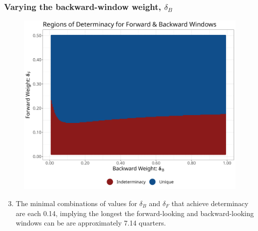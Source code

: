 \documentclass{beamer}
\begin{document}
\begin{frame}
	\frametitle{Varying the backward-window weight, $\delta_B$}	
	\begin{center}		
		\begin{figure}%
			\includegraphics[width=\textwidth,height=0.5\textheight,keepaspectratio]{../code/deltab_deltaF.png}
		\end{figure}%
	\end{center}%
	\begin{enumerate}
		\setcounter{enumi}{2}
		\setlength{\itemsep}{1em}
		\item The minimal combinations of values for $\delta_B$ and $\delta_F$ that achieve determinacy are each 0.14, implying the longest the forward-looking and backward-looking windows can be are approximately 7.14 quarters.
	\end{enumerate}
\end{frame}
\end{document}
